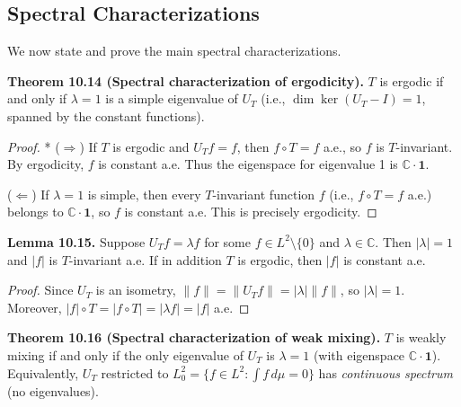 \subsection{Spectral Characterizations}\label{sec:10.5.2}

We now state and prove the main spectral characterizations.

\textbf{Theorem 10.14 (Spectral characterization of ergodicity).} $T$ is ergodic if and only if $\lambda = 1$ is a simple eigenvalue of $U_T$ (i.e., $\dim \ker(U_T - I) = 1$, spanned by the constant functions).

\begin{proof}
* ($\Rightarrow$) If $T$ is ergodic and $U_T f = f$, then $f \circ T = f$ a.e., so $f$ is $T$-invariant. By ergodicity, $f$ is constant a.e. Thus the eigenspace for eigenvalue 1 is $\mathbb{C} \cdot \mathbf{1}$.

($\Leftarrow$) If $\lambda = 1$ is simple, then every $T$-invariant function $f$ (i.e., $f \circ T = f$ a.e.) belongs to $\mathbb{C} \cdot \mathbf{1}$, so $f$ is constant a.e. This is precisely ergodicity.
\end{proof}


\textbf{Lemma 10.15.} Suppose $U_T f = \lambda f$ for some $f \in L^2 \setminus \{0\}$ and $\lambda \in \mathbb{C}$. Then $|\lambda| = 1$ and $|f|$ is $T$-invariant a.e. If in addition $T$ is ergodic, then $|f|$ is constant a.e.

\begin{proof}
Since $U_T$ is an isometry, $\|f\| = \|U_T f\| = |\lambda| \|f\|$, so $|\lambda| = 1$. Moreover, $|f| \circ T = |f \circ T| = |\lambda f| = |f|$ a.e.
\end{proof}

\textbf{Theorem 10.16 (Spectral characterization of weak mixing).} $T$ is weakly mixing if and only if the only eigenvalue of $U_T$ is $\lambda = 1$ (with eigenspace $\mathbb{C} \cdot \mathbf{1}$). Equivalently, $U_T$ restricted to $L^2_0 = \{f \in L^2 : \int f \, d\mu = 0\}$ has \textit{continuous spectrum} (no eigenvalues).

